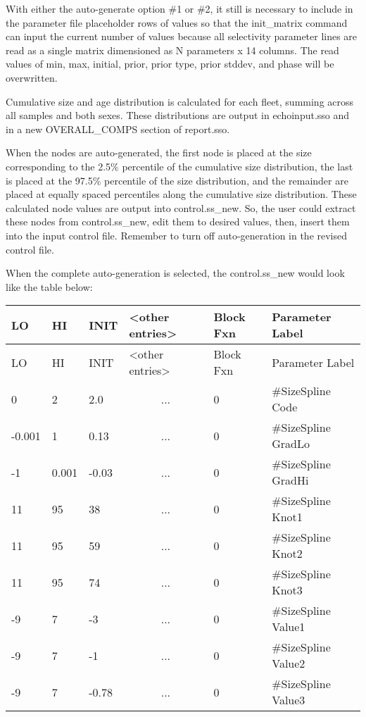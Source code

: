 With either the auto-generate option \#1 or \#2, it still is necessary to include in the parameter file placeholder rows of values so that the init\_matrix command can input the current number of values because all selectivity parameter lines are read as a single matrix dimensioned as N parameters x 14 columns.  The read values of min, max, initial, prior, prior type, prior stddev, and phase will be overwritten.
	
Cumulative size and age distribution is calculated for each fleet, summing across all samples and both sexes. These distributions are output in echoinput.sso and in a new OVERALL\_COMPS section of report.sso.
	
When the nodes are auto-generated, the first node is placed at the size corresponding to the 2.5\% percentile of the cumulative size distribution, the last is placed at the 97.5\% percentile of the size distribution, and the remainder are placed at equally spaced percentiles along the cumulative size distribution.  These calculated node values are output into control.ss\_new.  So, the user could extract these nodes from control.ss\_new, edit them to desired values, then, insert them into the input control file.  Remember to turn off auto-generation in the revised control file.
	
When the complete auto-generation is selected, the control.ss\_new would look like the table below:	

\begin{longtable}{p{1cm} p{1cm} p{1cm} p{2.9cm}  p{1.9cm}  p{4.2cm}}
	\hline
	LO \Tstrut & HI & INIT  &  <other entries> & Block Fxn & Parameter Label\Bstrut\\
	\hline
	\endfirsthead

	\hline
	LO \Tstrut & HI & INIT & <other entries> & Block Fxn & Parameter Label\Bstrut\\
	\hline
	\endhead

	0 \Tstrut &     2  &   2.0 & \multicolumn{1}{c}{...} & 0 & \#SizeSpline Code\\
	-0.001    & 	 1 &  0.13 & \multicolumn{1}{c}{...} & 0 & \#SizeSpline GradLo\\
	-1        & 0.001  & -0.03 & \multicolumn{1}{c}{...} & 0 & \#SizeSpline GradHi\\
	11        & 	95 & 	38 & \multicolumn{1}{c}{...} & 0 & \#SizeSpline Knot1\\
	11        & 	95 & 	59 & \multicolumn{1}{c}{...} & 0 & \#SizeSpline Knot2\\
	11        & 	95 & 	74 & \multicolumn{1}{c}{...} & 0 & \#SizeSpline Knot3\\
	-9        & 	 7 & 	-3 & \multicolumn{1}{c}{...} & 0 & \#SizeSpline Value1\\
	-9        &   	 7 & 	-1 & \multicolumn{1}{c}{...} & 0 & \#SizeSpline Value2\\
	-9        & 	 7 & -0.78 & \multicolumn{1}{c}{...} & 0 & \#SizeSpline Value3 \Bstrut\\
	\hline
\end{longtable}


